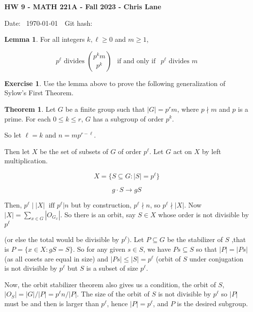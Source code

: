 \documentclass[11pt,oneside]{article}
\numberwithin{equation}{section}
\theoremstyle{definition}
\newtheorem{exercise}{Exercise}
\newtheorem{lemma}{Lemma}
\newtheorem{theorem}{Theorem}
\begin{document}
\textbf{HW 9 - MATH 221A - Fall 2023 - Chris Lane}

Date: \hhmmsstime{} \ \today \ \ Git hash: 


  \begin{lemma}
    For all integers $k, \ell \geq 0$ and $m \geq 1$,

    \[
    p ^ \ell \textrm{ divides }  { p^k m  \choose p^k } \ \ \textrm { if and only if } \ \ p ^ \ell \textrm{ divides } m
    \]
  \end{lemma}
\begin{exercise}
  Use the lemma above to prove the following generalization of Sylow's First Theorem.

  \begin{theorem}
    Let $G$ be a finite group such that $|G| = p^r m$, where $p \nmid m$ and $p$ is a prime.  For each
    $ 0 \leq k \leq r$, $G$ has a subgroup of order $p^k$.
  \end{theorem}
\end{exercise}
\begin{solution}
  So let $\ell = k$ and $n = m p ^ {r - \ell}$.  

  Then let $X$ be the set of subsets of $G$ of order $p ^ \ell$. Let $G$ act on $X$ by left multiplication.

  \[
  X = \{ S \subseteq G: |S| =  p^\ell \}
  \]

  \[
  g \cdot S \to gS
  \]

  Then, $ p ^ \ell \mid |X| \ \textrm{ iff } p ^ \ell | n$ but by construction, $ p^\ell \nmid n$, so
  $p^\ell \nmid |X|$.  Now
  $|X| = \sum _ { x \in G} |O_{G_x} |$.  So there is an orbit, say $S \in X$ whose order is not divisible by $p^\ell$

  (or else the total would be divisible by $p^\ell)$.   Let $P \subseteq G$ be the stabilizer of $S$ ,that is
  $ P = \{ x \in X : gS = S\}$.  So for any given $s \in S$, we have $P s \subseteq S$ so that $|P| = |Ps|$ (as all
  cosets are equal in size) and $|Ps| \leq |S| = p ^ \ell$ (orbit of $S$ under conjugation is not
  divisible by $p ^ \ell$ but $S$ is a subset of size $p ^ \ell$.

  Now, the orbit stabilizer theorem also gives us a condition, the orbit of $S$, $|O_S| = |G| / |P| = p^\ell n / |P|$.  The size of the  orbit of $S$ is not divisible by $p^\ell$ so $|P|$ must be and then is larger than $p^\ell$, hence $|P| = p^\ell$, and $P$ is the desired subgroup.  

  
\end{solution}
\end{document}
